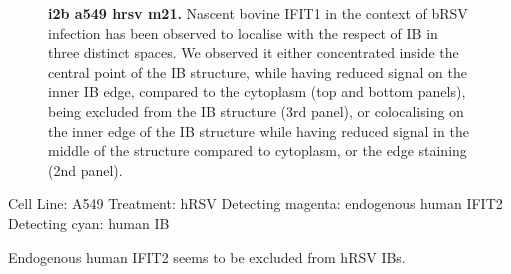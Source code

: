 \begin{figure}
\begin{subfigure}{1\textwidth}
    \end{subfigure}
    \caption[i2b a549 hrsv m21]{\textbf{i2b a549 hrsv m21.} Nascent bovine IFIT1 in the context of bRSV infection has been observed to localise with the respect of IB in three distinct spaces. We observed it either concentrated inside the central point of the IB structure, while having reduced signal on the inner IB edge, compared to the cytoplasm (top and bottom panels), being excluded from the IB structure (3rd panel), or colocalising on the inner edge of the IB structure while having reduced signal in the middle of the structure compared to cytoplasm, or the edge staining (2nd panel).}
    \label{fig:i2b a549 hrsv m21}
\end{figure}

Cell Line: A549 \newline
Treatment: hRSV \newline
Detecting magenta: endogenous human IFIT2  \newline
Detecting cyan: human IB \newline

Endogenous human IFIT2 seems to be excluded from hRSV IBs.

